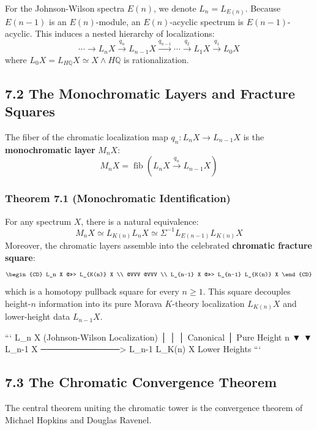 \documentclass[11pt,twoside,openright]{amsbook}
\begin{document}
{{For the Johnson-Wilson spectra $E(n)$, we denote $L_n = L_{E(n)}$. Because $E(n-1)$ is an $E(n)$-module, an $E(n)$-acyclic spectrum is $E(n-1)$-acyclic. This induces a nested hierarchy of localizations:
$$\cdots \longrightarrow L_n X \overset{q_n}{\longrightarrow} L_{n-1} X \overset{q_{n-1}}{\longrightarrow} \cdots \overset{q_2}{\longrightarrow} L_1 X \overset{q_1}{\longrightarrow} L_0 X$$
where $L_0 X = L_{H\mathbb{Q}} X \simeq X \wedge H\mathbb{Q}$ is rationalization.

\subsection{7.2 The Monochromatic Layers and Fracture Squares}
The fiber of the chromatic localization map $q_n: L_n X \to L_{n-1} X$ is the \textbf{monochromatic layer} $M_n X$:
$$M_n X = \operatorname{fib}\left( L_n X \overset{q_n}{\longrightarrow} L_{n-1} X \right)$$

\subsubsection{Theorem 7.1 (Monochromatic Identification)}
For any spectrum $X$, there is a natural equivalence:
$$M_n X \simeq L_{K(n)} L_n X \simeq \Sigma^{-1} L_{E(n-1)} L_{K(n)} X$$
Moreover, the chromatic layers assemble into the celebrated \textbf{chromatic fracture square}:
$$\begin{CD}
L_n X @>>> L_{K(n)} X \\
@VVV @VVV \\
L_{n-1} X @>>> L_{n-1} L_{K(n)} X
\end{CD}$$
which is a homotopy pullback square for every $n \geq 1$. This square decouples height-$n$ information into its pure Morava $K$-theory localization $L_{K(n)} X$ and lower-height data $L_{n-1} X$.

```
                       L_n X (Johnson-Wilson Localization)
                         │                          │
                         │ Canonical                │ Pure Height n
                         ▼                          ▼
                   L_{n-1} X ─────────────> L_{n-1} L_{K(n)} X
                               Lower Heights
```

\subsection{7.3 The Chromatic Convergence Theorem}
The central theorem uniting the chromatic tower is the convergence theorem of Michael Hopkins and Douglas Ravenel.

}}
\end{document}
